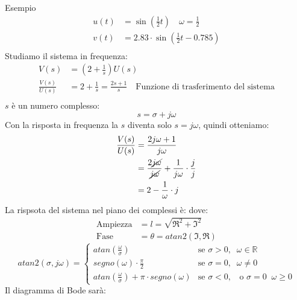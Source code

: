\documentclass[a4paper]{article}
\begin{document}
  \begin{examplebox}{Esempio}
    \[
      \begin{aligned}
        u(t) &= \sin(\frac{1}{2}t) \quad \omega = \frac{1}{2}\\
        v(t) &= 2.83 \cdot \sin\left(\frac{1}{2}t - 0.785\right)\\
      \end{aligned}
    \] 
    Studiamo il sistema in frequenza:
    \label{05-12-D4}
    \[
      \begin{aligned}
        V(s) &= \left( 2 + \frac{1}{s} \right) U(s)\\
        \frac{V(s)}{U(s)} &= 2 + \frac{1}{s} = \frac{2s + 1}{s} \quad \text{Funzione di trasferimento del sistema}\\
      \end{aligned}
    \] 
    \( s \) è un numero complesso:
    \[
      s = \sigma + j \omega
    \] 
    Con la risposta in frequenza la \( s \) diventa solo \( s = j \omega \), quindi
    otteniamo:
    \[
      \begin{aligned}
        \frac{V(s)}{U(s)} &= \frac{2j\omega + 1}{j\omega}\\
                          &= \frac{2 \cancel{j \omega}}{\cancel{j \omega}} + \frac{1}{j \omega} \cdot \frac{j}{j}\\
                          &= 2 - \frac{1}{\omega} \cdot j\\
      \end{aligned}
    \] 
    La rispsota del sistema nel piano dei complessi è:
    \label{05-12-D5}
    dove:
    \[
      \begin{aligned}
        \text{Ampiezza} &= l = \sqrt{\Re^2 + \Im^2}\\ 
        \text{Fase} &= \theta = atan2\left( \Im, \Re \right)
      \end{aligned}
    \]
    \[
      atan2(\sigma ,j \omega) =
      \begin{cases}
        atan \left( \frac{\omega}{\sigma } \right) & \text{se } \sigma > 0,\;\; \omega \in \mathbb{R}\\
        segno(\omega) \cdot \frac{\pi}{2} & \text{se } \sigma = 0,\;\; \omega \neq 0\\
        atan \left( \frac{\omega}{\sigma } \right) + \pi \cdot segno(\omega) & \text{se } \sigma < 0,\;\; \text{ o } \sigma =0\;\; \omega \ge  0
      \end{cases}
    \] 
    Il diagramma di Bode sarà:
  \end{examplebox}
\end{document}
